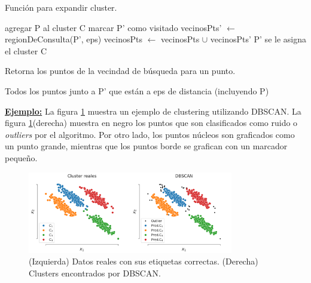 \begin{algorithm}[H]
  \caption{Función para expandir cluster.
    \label{alg:expandirCluster}}
  \begin{algorithmic}[1]
  \State agregar P al cluster C
         \State marcar P' como visitado\;
         \State vecinosPts' $\gets$ regionDeConsulta(P', eps)\;
            \State vecinosPts $\gets$ vecinosPts $\cup$ vecinosPts'
        \EndIf
    \EndIf
         \State P' se le asigna el cluster C
    \EndIf
    \EndFor
    \EndFunction
  \end{algorithmic}
\end{algorithm}


\begin{algorithm}[H]
  \caption{Retorna los puntos de la vecindad de búsqueda para un punto.
    \label{alg:regionDeConsulta}}
  \begin{algorithmic}[1]
    
    \Return Todos los puntos junto a P' que están a eps de distancia (incluyendo P)
    \EndFunction
  \end{algorithmic}
\end{algorithm}


\underline{\textbf{Ejemplo:}} La figura \ref{fig:dbscan} muestra un ejemplo de clustering utilizando DBSCAN. La figura \ref{fig:dbscan}(derecha) muestra en negro los puntos que son clasificados como ruido o \emph{outliers} por el algoritmo. Por otro lado, los puntos núcleos son graficados como un punto grande, mientras que los puntos borde se grafican con un marcador pequeño.

\begin{figure}[H]
  \centering
  \includegraphics[width=0.8\textwidth]{img/cap7_dbscan}
  \caption{(Izquierda) Datos reales con sus etiquetas correctas. (Derecha) Clusters encontrados por DBSCAN.}
  \label{fig:dbscan}
\end{figure}